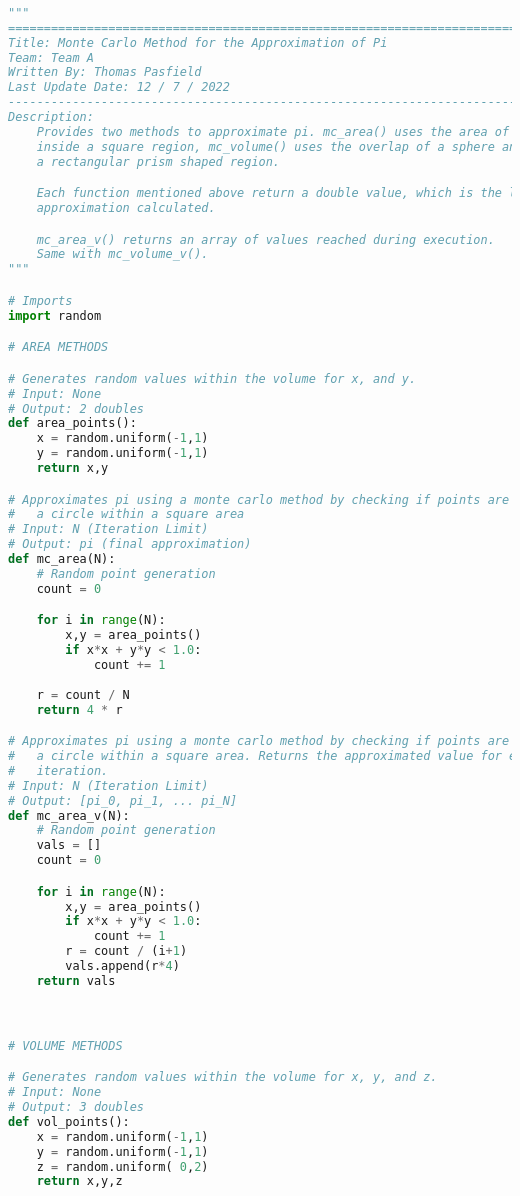 \documentclass[11pt]{article}
\begin{document}
\begin{lstlisting}[language=Python]
	
"""
===============================================================================
Title: Monte Carlo Method for the Approximation of Pi
Team: Team A
Written By: Thomas Pasfield
Last Update Date: 12 / 7 / 2022
-------------------------------------------------------------------------------
Description:
    Provides two methods to approximate pi. mc_area() uses the area of a circle 
    inside a square region, mc_volume() uses the overlap of a sphere and cone in
    a rectangular prism shaped region.

    Each function mentioned above return a double value, which is the last 
    approximation calculated.

    mc_area_v() returns an array of values reached during execution. 
    Same with mc_volume_v().
"""

# Imports
import random

# AREA METHODS

# Generates random values within the volume for x, and y.
# Input: None
# Output: 2 doubles
def area_points():
    x = random.uniform(-1,1)
    y = random.uniform(-1,1)
    return x,y

# Approximates pi using a monte carlo method by checking if points are within
#   a circle within a square area
# Input: N (Iteration Limit)
# Output: pi (final approximation)
def mc_area(N):
    # Random point generation
    count = 0

    for i in range(N):
        x,y = area_points()
        if x*x + y*y < 1.0:
            count += 1
    
    r = count / N
    return 4 * r

# Approximates pi using a monte carlo method by checking if points are within
#   a circle within a square area. Returns the approximated value for every
#   iteration.
# Input: N (Iteration Limit)
# Output: [pi_0, pi_1, ... pi_N]
def mc_area_v(N):
    # Random point generation
    vals = []
    count = 0

    for i in range(N):
        x,y = area_points()
        if x*x + y*y < 1.0:
            count += 1
        r = count / (i+1)
        vals.append(r*4)
    return vals



# VOLUME METHODS

# Generates random values within the volume for x, y, and z.
# Input: None
# Output: 3 doubles
def vol_points():
    x = random.uniform(-1,1)
    y = random.uniform(-1,1)
    z = random.uniform( 0,2)
    return x,y,z


\end{lstlisting}
\end{document}
